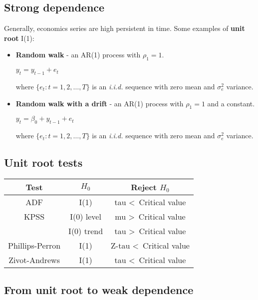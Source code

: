 \documentclass[10pt, a4paper, landscape]{article}
\begin{document}
\begin{multicols}{3}
\subsection*{Strong dependence}

Generally, economics series are high persistent in time. Some examples of \textbf{unit root} I(1):

\begin{itemize}[leftmargin=*]
	\item \textbf{Random walk} - an AR(1) process with \( \rho_{1} = 1 \).
	\begin{center}
		\( y_{t} = y_{t - 1} + e_{t} \)
	\end{center}
	where \( \{ e_{t} : t = 1, 2, \ldots, T \} \) is an \textsl{i.i.d.} sequence with zero mean and \( \sigma_{e}^{2} \) variance.
	\item \textbf{Random walk with a drift} - an AR(1) process with \( \rho_{1} = 1 \) and a constant.
	\begin{center}
		\( y_{t} = \beta_{0} + y_{t - 1} + e_{t} \)
	\end{center}
	where \( \{ e_{t} : t = 1, 2, \ldots, T \} \) is an \textsl{i.i.d.} sequence with zero mean and \( \sigma_{e}^{2} \) variance.
\end{itemize}

\subsection*{Unit root tests}

\begin{center}
	\begin{tabular}{ c | c | c }
		Test            & \( H_{0} \) & Reject \( H_{0} \)                 \\ \hline
		ADF             & I(1)        & tau \textless \, Critical value    \\ \hline
		KPSS            & I(0) level  & mu \textgreater \, Critical value  \\
		                & I(0) trend  & tau \textgreater \, Critical value \\ \hline
		Phillips-Perron & I(1)        & Z-tau \textless \, Critical value  \\ \hline
		Zivot-Andrews   & I(1)        & tau \textless \, Critical value
	\end{tabular}
\end{center}

\subsection*{From unit root to weak dependence}


\end{multicols}
\end{document}
